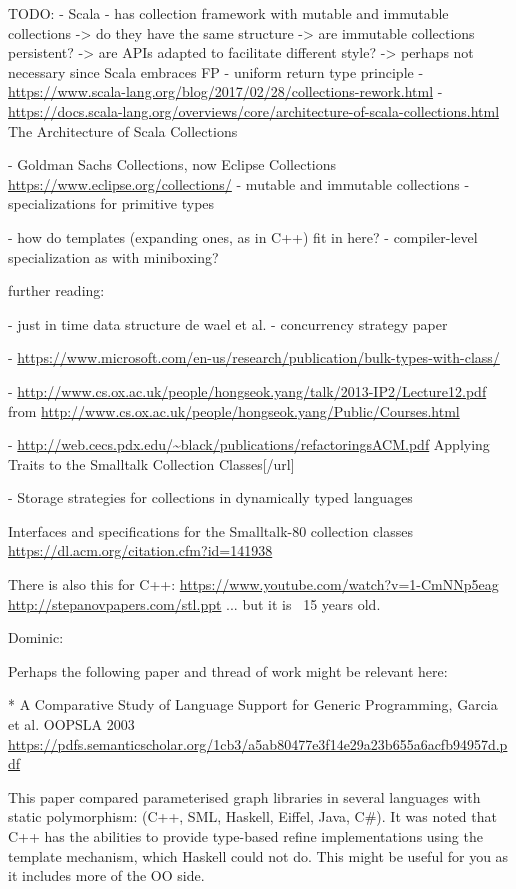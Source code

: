 \documentclass[sigconf, 10pt, review]{acmart}
\begin{document}
\begin{note}
TODO:
- Scala
  - has collection framework with mutable and immutable collections
    -> do they have the same structure 
    -> are immutable collections persistent?
    -> are APIs adapted to facilitate different style?
      -> perhaps not necessary since Scala embraces FP
  - uniform return type principle
  - \url{https://www.scala-lang.org/blog/2017/02/28/collections-rework.html}
 - \url{https://docs.scala-lang.org/overviews/core/architecture-of-scala-collections.html} 
   The Architecture of Scala Collections  

- Goldman Sachs Collections, now Eclipse Collections
\url{https://www.eclipse.org/collections/}
 - mutable and immutable collections
 - specializations for primitive types

- how do templates (expanding ones, as in C++) fit in here?
- compiler-level specialization as with miniboxing?

further reading:

- just in time data structure de wael et al.
- concurrency strategy paper

 - \url{https://www.microsoft.com/en-us/research/publication/bulk-types-with-class/}

 - \url{http://www.cs.ox.ac.uk/people/hongseok.yang/talk/2013-IP2/Lecture12.pdf}
   from \url{http://www.cs.ox.ac.uk/people/hongseok.yang/Public/Courses.html}
 
 - \url{http://web.cecs.pdx.edu/~black/publications/refactoringsACM.pdf}
   Applying Traits to the Smalltalk Collection Classes[/url]
 
 - Storage strategies for collections in dynamically typed languages \citep{Bolz:2013:SSC}

Interfaces and specifications for the Smalltalk-80 collection classes
\url{https://dl.acm.org/citation.cfm?id=141938}


There is also this for C++:
 \url{https://www.youtube.com/watch?v=1-CmNNp5eag}
 \url{http://stepanovpapers.com/stl.ppt}
... but it is ~15 years old.



Dominic:

Perhaps the following paper and thread of work might be relevant here:

* A Comparative Study of Language Support for Generic Programming, Garcia et al. OOPSLA 2003
\url{https://pdfs.semanticscholar.org/1cb3/a5ab80477e3f14e29a23b655a6acfb94957d.pdf}

This paper compared parameterised graph libraries in several languages with static polymorphism: (C++, SML, Haskell, Eiffel, Java, C\#). It was noted that C++ has the abilities to provide type-based refine implementations using the template mechanism, which Haskell could not do. This might be useful for you as it includes more of the OO side.


\end{note}
\end{document}

